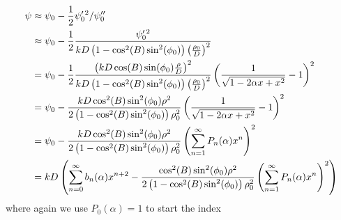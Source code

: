\documentclass{article}
\theoremstyle{plain}
\begin{document}
        \begin{subequations}
            \begin{align}
                \psi
                &\approx\psi_{0}-
                    \frac{1}{2}\psi^{\prime\,2}_{0}/\psi^{\prime\prime}_{0}\\
                &\approx
                \psi_{0}-\frac{1}{2}
                \frac{\psi^{\prime\,2}_{0}}{%
                    kD\left(1-\cos^{2}(B)\sin^{2}(\phi_{0})\right)
                    \left(\frac{\rho_{0}}{D}\right)^{2}
                }\\
                &=\psi_{0}-\frac{1}{2}
                    \frac{%
                        \left(
                            kD\cos(B)\sin(\phi_{0})\frac{\rho}{D}
                        \right)^{2}
                    }{%
                        kD\left(1-\cos^{2}(B)\sin^{2}(\phi_{0})\right)
                        \left(\frac{\rho_{0}}{D}\right)^{2}
                    }\left(
                        \frac{1}{\sqrt{1-2\alpha{x}+x^{2}}}-1
                    \right)^{2}\\
                &=\psi_{0}-
                    \frac{%
                        kD\cos^{2}(B)\sin^{2}(\phi_{0})\rho^{2}%
                    }{%
                        2\left(
                            1-\cos^{2}(B)\sin^{2}(\phi_{0})
                        \right)\rho_{0}^{2}
                    }\left(
                        \frac{1}{\sqrt{1-2\alpha{x}+x^{2}}}-1
                    \right)^{2}\\
                &=\psi_{0}-
                    \frac{%
                        kD\cos^{2}(B)\sin^{2}(\phi_{0})\rho^{2}%
                    }{%
                        2\left(1-\cos^{2}(B)\sin^{2}(\phi_{0})\right)
                        \rho_{0}^{2}
                    }\left(
                        \sum_{n=1}^{\infty}P_{n}(\alpha)x^{n}
                    \right)^{2}\\
                &=kD\left(
                    \sum_{n=0}^{\infty}b_{n}(\alpha)x^{n+2}-
                    \frac{%
                        \cos^{2}(B)\sin^{2}(\phi_{0})\rho^{2}
                    }{%
                        2\left(1-\cos^{2}(B)\sin^{2}(\phi_{0})\right)
                        \rho_{0}^{2}
                    }\left(
                        \sum_{n=1}^{\infty}P_{n}(\alpha)x^{n}
                    \right)^{2}
                \right)
            \end{align}
        \end{subequations}
        where again we use $P_{0}(\alpha)=1$ to start the index
\end{document}

